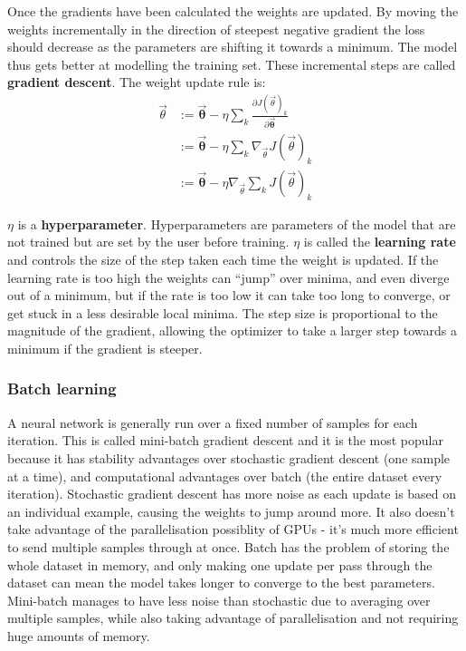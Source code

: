 Once the gradients have been calculated the weights are updated. By moving the weights incrementally in the direction of steepest 
negative gradient the loss should decrease as the parameters are shifting it towards a minimum. The model thus gets
better at modelling the training set. These incremental steps are called \textbf{gradient descent}. The weight update rule is: 
\begin{align}
  \vec{\theta} & := \mathbf{\vec{\theta}} - \eta \sum_{k} \frac{\partial J(\vec{\theta})_k}{\partial \mathbf{\vec{\theta}}} \\
  & := \mathbf{\vec{\theta}} - \eta \sum_{k} \nabla_{\vec{\theta}} J(\vec{\theta})_k \\
  & := \mathbf{\vec{\theta}} - \eta \nabla_{\vec{\theta}} \sum_{k} J(\vec{\theta})_k \label{eq:weight}
\end{align}

$\eta$ is a \textbf{hyperparameter}. Hyperparameters are parameters of the model that are not trained but are set by the user before training.
$\eta$ is called the \textbf{learning rate} and controls the size of the step taken each time the weight is updated. If the learning rate is 
too high the weights can ``jump'' over minima, and even diverge out of a minimum, but if the rate is too low it can take too long to converge,
or get stuck in a less desirable local minima. The step size is proportional to the magnitude of the gradient, allowing the optimizer to 
take a larger step towards a minimum if the gradient is steeper.

\subsubsection{Batch learning} \label{batch}

A neural network is generally run over a fixed number of samples for each iteration. This is called 
mini-batch gradient descent and it is the most popular because it has stability advantages over stochastic gradient descent (one sample at a time),
and computational advantages over batch (the entire dataset every iteration). 
Stochastic gradient descent has more noise as each update is based on an individual example, causing the weights to jump around more. It also doesn't take advantage of the 
parallelisation possiblity of GPUs - it's much more efficient to send multiple samples through at once. Batch has the problem of storing the whole 
dataset in memory, and only making one update per pass through the dataset can mean the model takes longer to converge to the best parameters. Mini-batch manages to
have less noise than stochastic due to averaging over multiple samples, while also taking advantage of parallelisation and not requiring huge amounts of memory.

